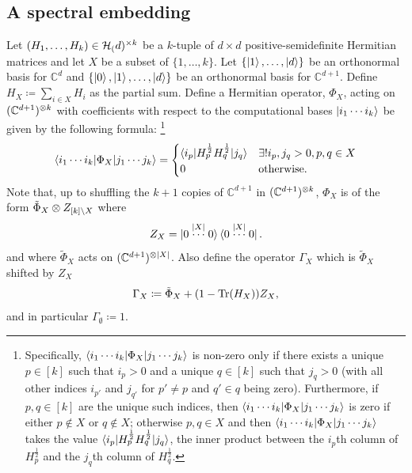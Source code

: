 \documentclass[notitlepage, 10pt]{article}
\begin{document}
\subsection{A spectral embedding}


\begin{defn}
    \label{defn:spec_embed}
    Let $(H_1, \ldots, H_k) \in \mathcal H_{(}d)^{\times k}$ be a $k$-tuple of $d\times d$ positive-semidefinite Hermitian matrices and let $X$ be a subset of $\{1, \ldots, k\}$.
    Let $\{\ket 1,\ldots, \ket d\}$ be an orthonormal basis for $\mathbb C^{d}$ and $\{\ket 0, \ket 1, \ldots, \ket d\}$ be an orthonormal basis for $\mathbb C^{d+1}$.
    Define $H_{X} \coloneqq \sum_{i \in X}H_i$ as the partial sum.
    Define a Hermitian operator, $\Phi_{X}$, acting on $(\mathbb C^{d+1})^{\otimes k}$ with coefficients with respect to the computational bases $\ket{i_1\cdots i_k}$ be given by the following formula:%
    \footnote{%
        Specifically, $\braket{i_1\cdots i_k | \Phi_{X} | j_1\cdots j_k}$ is non-zero only if there exists a unique $p \in [k]$ such that $i_p > 0$ and a unique $q \in [k]$ such that $j_q > 0$ (with all other indices $i_{p'}$ and $j_{q'}$ for $p' \neq p$ and $q' \in q$ being zero). 
        Furthermore, if $p, q \in [k]$ are the unique such indices, then $\braket{i_1\cdots i_k | \Phi_{X} | j_1\cdots j_k}$ is zero if either $p \not \in X$ or $q \not \in X$; otherwise $p,q \in X$ and then  $\braket{i_1\cdots i_k | \Phi_{X} | j_1\cdots j_k}$ takes the value $\braket{i_p | H_{p}^{\frac{1}{2}} H_{q}^{\frac{1}{2}} | j_{q}}$, the inner product between the $i_{p}$th column of $H_{p}^{\frac{1}{2}}$ and the $j_q$th column of $H_{q}^{\frac{1}{2}}$.
    }%
    \begin{equation}
        \braket{i_1\cdots i_k | \Phi_{X} | j_1\cdots j_k} =
        \begin{cases}
            \braket{i_p | H_{p}^{\frac{1}{2}} H_{q}^{\frac{1}{2}} | j_{q}} & \exists! i_p, j_q > 0, p, q \in X \\
            0 & \text{otherwise}.
        \end{cases}
    \end{equation}
    Note that, up to shuffling the $k+1$ copies of $\mathbb C^{d+1}$ in $(\mathbb C^{d+1})^{\otimes k}$, $\Phi_{X}$ is of the form $\tilde \Phi_{X} \otimes Z_{[k]\setminus X}$ where
    \begin{equation}
        Z_{X} = \ket{0\stackrel{\left|X\right|}{\cdots} 0}\bra{0\stackrel{\left|X\right|}{\cdots} 0}.
    \end{equation}
    and where $\tilde \Phi_{X}$ acts on $(\mathbb C^{d+1})^{\otimes \left|X\right|}$.
    Also define the operator $\Gamma_{X}$ which is $\tilde \Phi_{X}$ shifted by $Z_{X}$ 
    \begin{equation}
        \Gamma_{X} \coloneqq  \tilde \Phi_{X} + (1-\operatorname{Tr}(H_{X})) Z_{X},
    \end{equation}
    and in particular $\Gamma_{\emptyset} \coloneqq 1$.
\end{defn}
\end{document}
